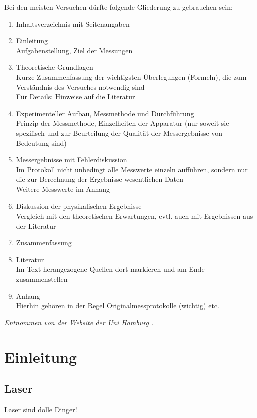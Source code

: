 \documentclass[10pt,a4paper]{article}
\begin{document}
Bei den meisten Versuchen dürfte folgende Gliederung zu gebrauchen sein:

\begin{enumerate}

    \item{Inhaltsverzeichnis mit Seitenangaben}
    \item{Einleitung}\\
    Aufgabenstellung, Ziel der Messungen
    \item{Theoretische Grundlagen}\\
    Kurze Zusammenfassung der wichtigsten Überlegungen (Formeln), die zum Verständnis des Versuches notwendig sind\\
    Für Details: Hinweise auf die Literatur
    \item{Experimenteller Aufbau, Messmethode und Durchführung}\\
    Prinzip der Messmethode, Einzelheiten der Apparatur (nur soweit sie spezifisch und zur Beurteilung der Qualität der Messergebnisse von Bedeutung sind)
    \item{Messergebnisse mit Fehlerdiskussion}\\
    Im Protokoll nicht unbedingt alle Messwerte einzeln aufführen, sondern nur die zur Berechnung der Ergebnisse wesentlichen Daten\\
    Weitere Messwerte im Anhang
    \item{Diskussion der physikalischen Ergebnisse}\\
    Vergleich mit den theoretischen Erwartungen, evtl. auch mit Ergebnissen aus der Literatur
    \item{Zusammenfassung}
    \item{Literatur}\\
    Im Text herangezogene Quellen dort markieren und am Ende zusammenstellen
   \item{Anhang}\\
    Hierhin gehören in der Regel Originalmessprotokolle (wichtig) etc. 
    
\end{enumerate}

\textit{Entnommen von der Website der Uni Hamburg \cite{hinweise}.}

\section{Einleitung}
\subsection{Laser} Laser sind dolle Dinger!
\end{document}
